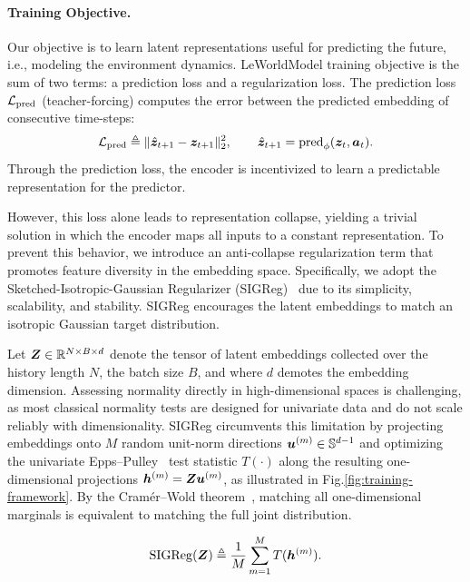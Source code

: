 \paragraph{Training Objective.}
Our objective is to learn latent representations useful for predicting the future, i.e., modeling the environment dynamics. {\rm LeWorldModel} training objective is the sum of two terms: a prediction loss and a regularization loss. The prediction loss $\mathcal{L}_{\rm pred}$ (teacher-forcing) computes the error between the predicted embedding of consecutive time-steps:
\begin{equation}
    \mathcal{L}_{\rm pred} \triangleq  \|\hat{{\bm{z}}}_{t+1} - {{\bm{z}}}_{t+1}\|^2_2, 
    \quad\quad 
    \hat{{\bm{z}}}_{t+1} = {\rm pred}_\phi({\bm{z}}_t, {\bm{a}}_t).
\end{equation} 
Through the prediction loss, the encoder is incentivized to learn a predictable representation for the predictor.

However, this loss alone leads to representation collapse, yielding a trivial solution in which the encoder maps all inputs to a constant representation. To prevent this behavior, we introduce an anti-collapse regularization term that promotes feature diversity in the embedding space. Specifically, we adopt the Sketched-Isotropic-Gaussian Regularizer (SIGReg)~\cite{balestriero2025lejepa} due to its simplicity, scalability, and stability. SIGReg encourages the latent embeddings to match an isotropic Gaussian target distribution.

Let ${\bm{Z}} \in \mathbb{R}^{N \times B \times d}$ denote the tensor of latent embeddings collected over the history length $N$, the batch size $B$, and where $d$ demotes the embedding dimension. Assessing normality directly in high-dimensional spaces is challenging, as most classical normality tests are designed for univariate data and do not scale reliably with dimensionality. SIGReg circumvents this limitation by projecting embeddings onto $M$ random unit-norm directions ${\bm{u}}^{(m)} \in \mathbb{S}^{d-1}$ and optimizing the univariate Epps--Pulley~\cite{epps1983test} test statistic $T(\cdot)$ along the resulting one-dimensional projections ${\bm{h}}^{(m)} = {\bm{Z}} {\bm{u}}^{(m)}$, as illustrated in Fig.\ref{fig:training-framework}. By the Cramér--Wold theorem~\cite{cramer1936some}, matching all one-dimensional marginals is equivalent to matching the full joint distribution.

\begin{equation}
    {\rm SIGReg}({\bm{Z}}) \triangleq  \frac{1}{M} \sum_{m=1}^M T({\bm{h}}^{(m)}).
\end{equation}

